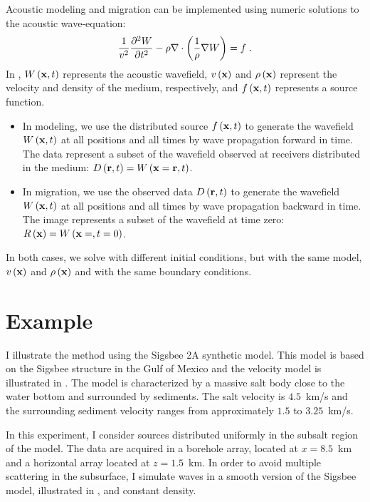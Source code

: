 Acoustic modeling and migration can be implemented using numeric
solutions to the acoustic wave-equation:
%
\begin{equation} \label{eqn:AWE}
  \frac{1}{v^2} \frac{\partial^2 W}{\partial t^2} - 
  \rho \nabla \cdot {\left (\frac{1}{\rho} \nabla {W} \right)} = f \;.
\end{equation}
%
In , $W\left ( {\bf x}, t \right)$ represents the acoustic wavefield, $v\left ( {\bf x} \right)$
and $\rho\left ( {\bf x} \right)$ represent the velocity and density of the medium,
respectively, and $f\left ( {\bf x}, t \right)$ represents a source function.
\begin{itemize}
\item In modeling, we use the distributed source $f\left ( {\bf x}, t \right)$ to generate
  the wavefield $W\left ( {\bf x}, t \right)$ at all positions and all times by wave
  propagation forward in time. The data represent a subset of the
  wavefield observed at receivers distributed in the medium: $D\left (
  {\bf r},t \right)=W\left ( {\bf x}={\bf r},t \right)$.
\item In migration, we use the observed data $D\left ( {\bf r},t \right)$ to
  generate the wavefield $W\left ( {\bf x}, t \right)$ at all positions and all times by
  wave propagation backward in time. The image represents a subset of
  the wavefield at time zero: $R\left ( {\bf x} \right)=W\left ( {\bf x}=,t=0 \right)$.
\end{itemize}
In both cases, we solve  with different initial conditions,
but with the same model, $v\left ( {\bf x} \right)$ and $\rho\left ( {\bf x} \right)$ and with the same
boundary conditions.

\section{Example}


I illustrate the method using the Sigsbee 2A synthetic model.  This
model is based on the Sigsbee structure in the Gulf of Mexico and the
velocity model is illustrated in . The model is
characterized by a massive salt body close to the water bottom and
surrounded by sediments. The salt velocity is $4.5$~km/s and the
surrounding sediment velocity ranges from approximately $1.5$ to
$3.25$~km/s.


In this experiment, I consider sources distributed uniformly in the
subsalt region of the model. The data are acquired in a borehole
array, located at $x=8.5$~km and a horizontal array located at
$z=1.5$~km. In order to avoid multiple scattering in the subsurface, I
simulate waves in a smooth version of the Sigsbee model, illustrated in
, and constant density.

